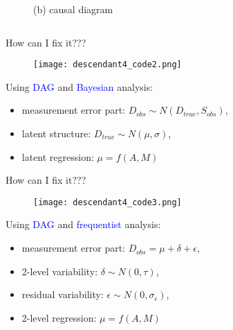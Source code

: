 \begin{frame}
\begin{columns}
\begin{column}{0.5\textwidth}
\begin{figure}
				\caption*{(b) causal diagram}
			\end{figure}
		\end{column}
	\end{columns}
\end{frame}
%
%
\begin{lhframe}[rhgraphic={\texttt{[image: descendant4\_reg3.png]}}]
	{How can I fix it???}
	
	\begin{figure}
		\texttt{[image: descendant4\_code2.png]}
	\end{figure}
	
	Using \textcolor{blue}{DAG} and \textcolor{blue}{Bayesian} analysis:
	\begin{itemize}
		\item measurement error part: $D_{obs} \sim N( D_{true}, S_{obs})$, 
		\item latent structure: $D_{true} \sim N( \mu, \sigma )$,
		\item latent regression: $\mu = f(A, M)$
	\end{itemize}
\end{lhframe}
%
%
\begin{lhframe}[rhgraphic={\texttt{[image: descendant4\_reg4.png]}}]
	{How can I fix it???}
	
	\begin{figure}
		\texttt{[image: descendant4\_code3.png]}
	\end{figure}
	
	Using \textcolor{blue}{DAG} and \textcolor{blue}{frequentist} analysis:
	\begin{itemize}
		\item measurement error part: $D_{obs} = \mu + \delta + \epsilon$, 
		\item 2-level variability: $\delta \sim N(0, \tau)$,
		\item residual variability: $\epsilon \sim N(0, \sigma_{\epsilon})$,
		\item 2-level regression: $\mu = f(A, M)$
	\end{itemize}
\end{lhframe}
%
%
